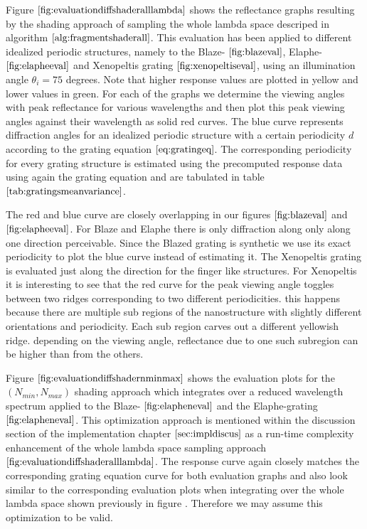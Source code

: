 Figure $\ref{fig:evaluationdiffshaderalllambda}$ shows the reflectance graphs resulting by the shading approach of sampling the whole lambda space descriped in algorithm $\ref{alg:fragmentshaderall}$. This evaluation has been applied to different idealized periodic structures, namely to the Blaze- $\ref{fig:blazeval}$, Elaphe- $\ref{fig:elapheeval}$ and Xenopeltis grating $\ref{fig:xenopeltiseval}$, using an illumination angle $\theta_i = 75$ degrees. Note that higher response values are plotted in yellow and lower values in green. For each of the graphs we determine the viewing angles with peak reflectance for various wavelengths and then plot this peak viewing angles against their wavelength as solid red curves. The blue curve represents diffraction angles for an idealized periodic structure with a certain periodicity $d$ according to the grating equation $\ref{eq:gratingeq}$. The corresponding periodicity for every grating structure is estimated using the precomputed response data using again the grating equation and are tabulated in table $\ref{tab:gratingsmeanvariance}$. 

The red and blue curve are closely overlapping in our figures $\ref{fig:blazeval}$ and $\ref{fig:elapheeval}$. For Blaze and Elaphe there is only diffraction along only along one direction perceivable. Since the Blazed grating is synthetic we use its exact periodicity to plot the blue curve instead of estimating it. The Xenopeltis grating is evaluated just along the direction for the finger like structures. For Xenopeltis it is interesting to see that the red curve for the peak viewing angle toggles between two ridges corresponding to two different periodicities. this happens because there are multiple sub regions of the nanostructure with slightly different orientations and periodicity. Each sub region carves out a different yellowish ridge. depending on the viewing angle, reflectance due to one such subregion can be higher than from the others.

Figure $\ref{fig:evaluationdiffshadernminmax}$ shows the evaluation plots for the $(N_{min},N_{max})$ shading approach which integrates over a reduced wavelength spectrum applied to the Blaze- $\ref{fig:elapheneval}$ and the Elaphe-grating $\ref{fig:elapheneval}$. This optimization approach is mentioned within the discussion section of the implementation chapter $\ref{sec:impldiscus}$ as a run-time complexity enhancement of the whole lambda space sampling approach $\ref{fig:evaluationdiffshaderalllambda}$. The response curve again closely matches the corresponding grating equation curve for both evaluation graphs and also look similar to the corresponding evaluation plots when integrating over the whole lambda space shown previously in figure $\label{ref:evaluationdiffshaderalllambda}$. Therefore we may assume this optimization to be valid. 

